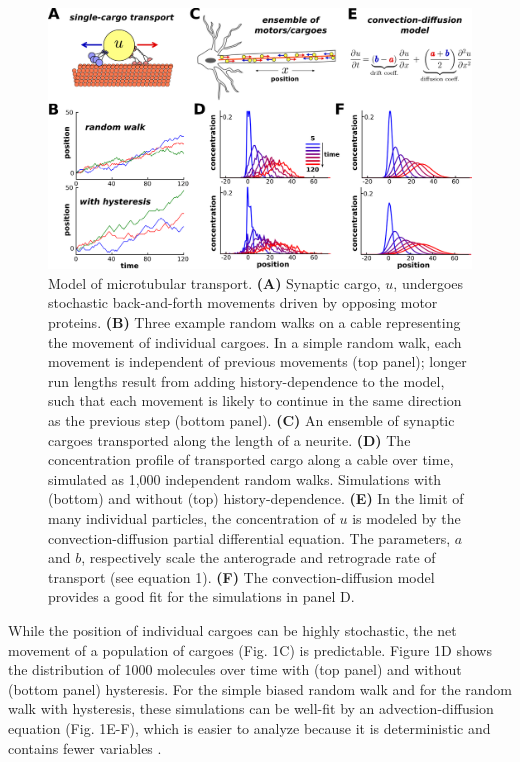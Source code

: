 \documentclass[11pt]{wlpeerj}
\begin{document}
\begin{figure}[!t]
\begin{center}
\includegraphics[width=0.9\columnwidth]{00_stochastic.png}
\caption{Model of microtubular transport.
\textbf{(A)} Synaptic cargo, $u$, undergoes stochastic back-and-forth movements driven by opposing motor proteins.
\textbf{(B)} Three example random walks on a cable representing the movement of individual cargoes. In a simple random walk, each movement is independent of previous movements (top panel); longer run lengths result from adding history-dependence to the model, such that each movement is likely to continue in the same direction as the previous step (bottom panel).
\textbf{(C)} An ensemble of synaptic cargoes transported along the length of a neurite.
\textbf{(D)} The concentration profile of transported cargo along a cable over time, simulated as 1,000 independent random walks. Simulations with (bottom) and without (top) history-dependence.
\textbf{(E)} In the limit of many individual particles, the concentration of $u$ is modeled by the convection-diffusion partial differential equation. The parameters, $a$ and $b$, respectively scale the anterograde and retrograde rate of transport (see equation 1).
\textbf{(F)} The convection-diffusion model provides a good fit for the simulations in panel D.
}
\end{center}
\end{figure}

While the position of individual cargoes can be highly stochastic, the net movement of a population of cargoes (Fig. 1C) is predictable.
Figure 1D shows the distribution of 1000 molecules over time with (top panel) and without (bottom panel) hysteresis.
For the simple biased random walk and for the random walk with hysteresis, these simulations can be well-fit by an advection-diffusion equation (Fig. 1E-F), which is easier to analyze because it is deterministic and contains fewer variables \citep{Smith_2001}.
\end{document}
